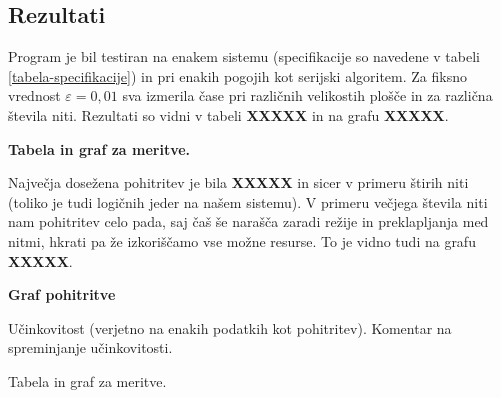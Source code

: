 \documentclass[a4paper,titlepage,11pt]{article}
\begin{document}
\subsection{Rezultati}

Program je bil testiran na enakem sistemu (specifikacije so navedene v tabeli \ref{tabela-specifikacije}) in pri enakih pogojih kot serijski algoritem. Za fiksno vrednost \(\varepsilon = 0,01\) sva izmerila čase pri različnih velikostih plošče in za različna števila niti. Rezultati so vidni v tabeli \textbf{XXXXX} in na grafu \textbf{XXXXX}.

\textbf{Tabela in graf za meritve.}

Največja dosežena pohitritev je bila \textbf{XXXXX} in sicer v primeru štirih niti (toliko je tudi logičnih jeder na našem sistemu). V primeru večjega števila niti nam pohitritev celo pada, saj čaš še narašča zaradi režije in preklapljanja med nitmi, hkrati pa že izkoriščamo vse možne resurse. To je vidno tudi na grafu \textbf{XXXXX}.

\textbf{Graf pohitritve}

Učinkovitost (verjetno na enakih podatkih kot pohitritev). Komentar na spreminjanje učinkovitosti.

Tabela in graf za meritve.
\end{document}
